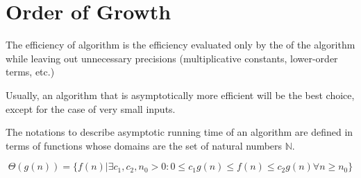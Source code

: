 \chapter{Order of Growth}

  \par The  efficiency of algorithm is the efficiency
  evaluated only by the  of the algorithm while leaving
  out unnecessary precisions (multiplicative constants, lower-order terms,
  etc.)
  \par Usually, an algorithm that is asymptotically more efficient will
  be the best choice, except for the case of very small inputs.

  \par The notations to describe asymptotic running time of an algorithm
  are defined in terms of functions whose domains are the set of natural
  numbers $\mathbb{N}$.
  
    \begin{equation}
      \Theta(g(n)) = \{f(n) | \exists c_{1}, c_{2}, n_{0} > 0:
      0 \leq c_{1}g(n) \leq f(n) \leq c_{2}g(n) \forall n \geq n_{0}\}
    \end{equation}